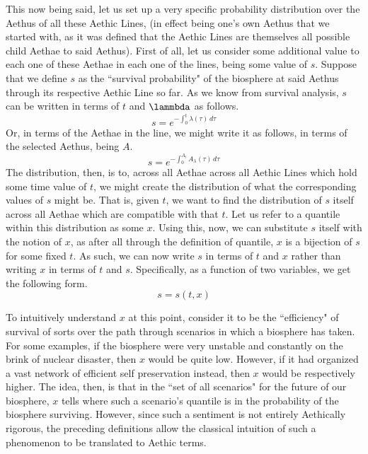This now being said, let us set up a very specific probability distribution over the Aethus of all these Aethic Lines, (in effect being one's own Aethus that we started with, as it was defined that the Aethic Lines are themselves all possible child Aethae to said Aethus). First of all, let us consider some additional value to each one of these Aethae in each one of the lines, being some value of $s$. Suppose that we define $s$ as the ``survival probability" of the biosphere at said Aethus through its respective Aethic Line so far. As we know from survival analysis, $s$ can be written in terms of $t$ and $\lammbda$ as follows.
\begin{equation}
    s = e^{-\int_0^{t} \lambda \left( \tau \right) \, d\tau}
\end{equation}
Or, in terms of the Aethae in the line, we might write it as follows, in terms of the selected Aethus, being $A$.
\begin{equation}
    s = e^{-\int_0^{A_t} A_\lambda \left( \tau \right) \, d\tau}
\end{equation}
The distribution, then, is to, across all Aethae across all Aethic Lines which hold some time value of $t$, we might create the distribution of what the corresponding values of $s$ might be. That is, given $t$, we want to find the distribution of $s$ itself across all Aethae which are compatible with that $t$. Let us refer to a quantile within this distribution as some $x$. Using this, now, we can substitute $s$ itself with the notion of $x$, as after all through the definition of quantile, $x$ is a bijection of $s$ for some fixed $t$. As such, we can now write $s$ in terms of $t$ and $x$ rather than writing $x$ in terms of $t$ and $s$. Specifically, as a function of two variables, we get the following form.
\begin{equation}
    s = s \! \left( t, x \right)
\end{equation}

To intuitively understand $x$ at this point, consider it to be the ``efficiency" of survival of sorts over the path through scenarios in which a biosphere has taken. For some examples, if the biosphere were very unstable and constantly on the brink of nuclear disaster, then $x$ would be quite low. However, if it had organized a vast network of efficient self preservation instead, then $x$ would be respectively higher. The idea, then, is that in the ``set of all scenarios" for the future of our biosphere, $x$ tells where such a scenario's quantile is in the probability of the biosphere surviving. However, since such a sentiment is not entirely Aethically rigorous, the preceding definitions allow the classical intuition of such a phenomenon to be translated to Aethic terms. 

